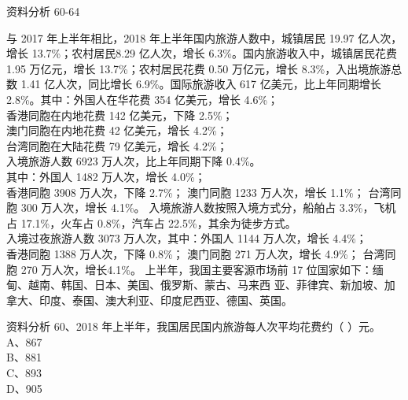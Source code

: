 \documentclass[aspectratio=169]{beamer}
\begin{document}
\begin{frame}[t]{资料分析}
    60-64\\
    {\scriptsize
    与 2017 年上半年相比，2018 年上半年国内旅游人数中，城镇居民 19.97 亿人次，增长 13.7\%；农村居民8.29 亿人次，增长 6.3\%。国内旅游收入中，城镇居民花费 1.95 万亿元，增长 13.7\%；农村居民花费 0.50 万亿元，增长 8.3\%，入出境旅游总数 1.41 亿人次，同比增长 6.9\%。国际旅游收入 617 亿美元，比上年同期增长 2.8\%。其中：外国人在华花费 354 亿美元，增长 4.6\%；\\

    香港同胞在内地花费 142 亿美元，下降 2.5\%；\\
    澳门同胞在内地花费 42 亿美元，增长 4.2\%；\\
    台湾同胞在大陆花费 79 亿美元，增长 4.2\%；\\
    入境旅游人数 6923 万人次，比上年同期下降 0.4\%。\\
    其中：外国人 1482 万人次，增长 4.0\%；\\
    香港同胞 3908 万人次，下降 2.7\%；
    澳门同胞 1233 万人次，增长 1.1\%；
    台湾同胞 300 万人次，增长 4.1\%。
    入境旅游人数按照入境方式分，船舶占 3.3\%，飞机占 17.1\%，火车占 0.8\%，汽车占 22.5\%，其余为徒步方式。\\
    入境过夜旅游人数 3073 万人次，其中：外国人 1144 万人次，增长 4.4\%；\\
    香港同胞 1388 万人次，下降 0.8\%；
    澳门同胞 271 万人次，增长 4.9\%；
    台湾同胞 270 万人次，增长4.1\%。
    上半年，我国主要客源市场前 17 位国家如下：缅甸、越南、韩国、日本、美国、俄罗斯、蒙古、马来西
    亚、菲律宾、新加坡、加拿大、印度、泰国、澳大利亚、印度尼西亚、德国、英国。

    }
\end{frame}                           



\begin{frame}[t]{资料分析}
    60、2018 年上半年，我国居民国内旅游每人次平均花费约（ ）元。   \\
    A、867                                                         \\
    B、881                                                         \\
    C、893                                                         \\
    D、905                                                         \\
\end{frame}                           
\end{document}
